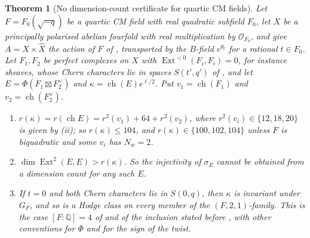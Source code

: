 \documentclass[11pt,reqno]{amsart}
\theoremstyle{plain}
\newtheorem{theorem}{Theorem}[section]
\theoremstyle{definition}
\theoremstyle{remark}
\newcommand{\QQ}{\mathbb{Q}}
\newcommand{\cO}{\mathcal{O}}
\DeclareMathOperator{\ch}{ch}
\DeclareMathOperator{\Ext}{Ext}
\begin{document}
\begin{theorem}[No dimension-count certificate for quartic CM fields]
\label{thm:quarticobstruction}
Let $F=F_{0}(\sqrt{-q})$ be a quartic CM field with real quadratic subfield
$F_{0}$, let $X$ be a principally polarised abelian fourfold with real
multiplication by $\cO_{F_{0}}$, and give $A=X\times\widehat X$ the action of
$F$ of \cite[\S11.1]{Mar25c}, transported by the $B$-field $e^{\theta_{t}}$ for a
rational $t\in F_{0}$. Let $F_{1},F_{2}$
be perfect complexes on $X$ with $\Ext^{<0}(F_{i},F_{i})=0$, for instance
sheaves, whose Chern characters lie in spaces $S(t',q')$ of
, and let $E=\Phi(F_{1}\boxtimes F_{2}^{\vee})$ and
$\kappa=\ch(E)e^{\ell/2}$. Put $v_{1}=\ch(F_{1})$ and $v_{2}=\ch(F_{2}^{\vee})$.
\begin{enumerate}[label=\textup{(\roman*)},leftmargin=2.6em,itemsep=2pt]
\item $r(\kappa)=r(\ch E)=r^{2}(v_{1})+64+r^{2}(v_{2})$, where
  $r^{2}(v_{i})\in\{12,18,20\}$ is given by (ii); so
  $r(\kappa)\le104$, and $r(\kappa)\in\{100,102,104\}$ unless $F$ is
  biquadratic and some $v_{i}$ has $N_{w}=2$.
\item $\dim\Ext^{2}(E,E)>r(\kappa)$. So the injectivity of $\sigma_{E}$ cannot
  be obtained from a dimension count for any such $E$.
\item If $t=0$ and both Chern characters lie in $S(0,q)$, then $\kappa$ is
  invariant under $G_{F}$, and so is a Hodge class on every member of the
  $(F,2,1)$-family. This is the case $[F:\QQ]=4$ of
  \cite[Proposition~10.2.1(1)]{Mar25c} and of the inclusion stated before
  \cite[Lemma~10.1.3]{Mar25c}, with other conventions for $\Phi$ and for the
  sign of the twist.
\end{enumerate}
\end{theorem}
\end{document}
